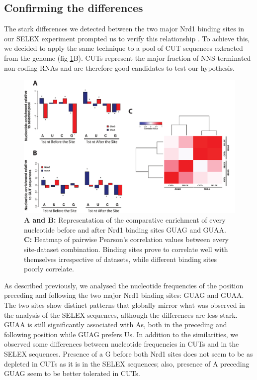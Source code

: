 \subsection{Confirming the differences \invivo{}}

The stark differences we detected between the two major Nrd1 binding sites in our SELEX experiment prompted us to verify this relationship \invivo{}. To achieve this, we decided to apply the same technique to a pool of CUT sequences extracted from the genome (fig \ref{fig:flanking}B). CUTs represent the major fraction of NNS terminated non-coding RNAs and are therefore good candidates to test our hypothesis.

\begin{figure}[h!]

\centering
\includegraphics[width=\textwidth]{figures/results/gtagGtaaFlanking}
\caption[Comparison of flanking nucleotides between GUAG and GUAA in SELEX and genomic CUT sequences]{\textbf{A and B: }Representation of the comparative enrichment of every nucleotide before and after Nrd1 binding sites GUAG and GUAA.  \textbf{C: }Heatmap of pairwise Pearson's correlation values between every site-dataset combination. Binding sites prove to correlate well with themselves irrespective of datasets, while different binding sites poorly correlate.}
\label{fig:flanking}

\end{figure} 

As described previously, we analysed the nucleotide frequencies of the position preceding and following the two major Nrd1 binding sites: GUAG and GUAA. The two sites show distinct patterns that globally mirror what was observed in the analysis of the SELEX sequences, although the differences are less stark. GUAA is still significantly associated with As, both in the preceding and following position while GUAG prefers Us. In addition to the similarities, we observed some differences between nucleotide frequencies in CUTs and in the SELEX sequences. Presence of a G before both Nrd1 sites does not seem to be as depleted in CUTs as it is in the SELEX sequences; also, presence of A preceding GUAG seem to be better tolerated in CUTs. 

